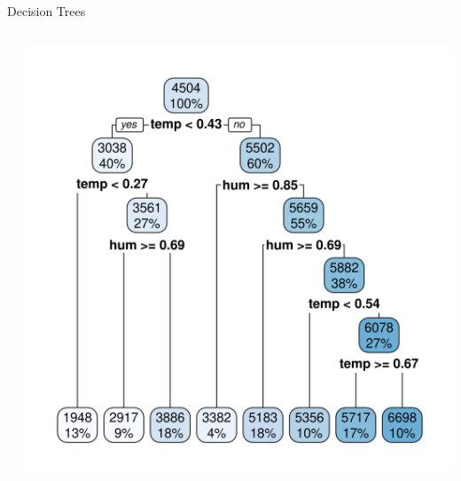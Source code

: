 \documentclass[11pt,compress,t,notes=noshow, aspectratio=169, xcolor=table]{beamer}
\begin{document}
\begin{frame}{Decision Trees}

\begin{columns}[T]
  \begin{column}{0.5\textwidth}
     \tiny
     
  \end{column}
  \begin{column}{0.5\textwidth}
      \includegraphics[width = \textwidth]{figure/rpart_plot.png}
  \end{column}
\end{columns}

\end{frame}

\end{document}
